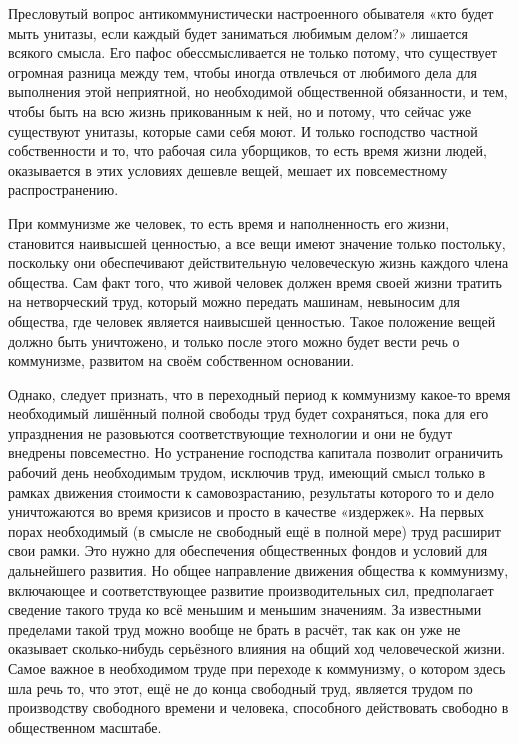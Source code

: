 \documentclass[../main]{subfiles}
\begin{document}
Пресловутый вопрос антикоммунистически настроенного обывателя «кто будет мыть унитазы, если каждый будет заниматься любимым делом?» лишается всякого смысла. Его пафос обессмысливается не только потому, что существует огромная разница между тем, чтобы иногда отвлечься от любимого дела для выполнения этой неприятной, но необходимой общественной обязанности, и тем, чтобы быть на всю жизнь прикованным к ней, но и потому, что сейчас уже существуют унитазы, которые сами себя моют. И только господство частной собственности и то, что рабочая сила уборщиков, то есть время жизни людей, оказывается в этих условиях дешевле вещей, мешает их повсеместному распространению.

При коммунизме же человек, то есть время и наполненность его жизни, становится наивысшей ценностью, а все вещи имеют значение только постольку, поскольку они обеспечивают действительную человеческую жизнь каждого члена общества. Сам факт того, что живой человек должен время своей жизни тратить на нетворческий труд, который можно передать машинам, невыносим для общества, где человек является наивысшей ценностью. Такое положение вещей должно быть уничтожено, и только после этого можно будет вести речь о коммунизме, развитом на своём собственном основании.

Однако, следует признать, что в переходный период к коммунизму какое-то время необходимый лишённый полной свободы труд будет сохраняться, пока для его упразднения не разовьются соответствующие технологии и они не будут внедрены повсеместно. Но устранение господства капитала позволит ограничить рабочий день необходимым трудом, исключив труд, имеющий смысл только в рамках движения стоимости к самовозрастанию, результаты которого то и дело уничтожаются во время кризисов и просто в качестве «издержек». На первых порах необходимый (в смысле не свободный ещё в полной мере) труд расширит свои рамки. Это нужно для обеспечения общественных фондов и условий для дальнейшего развития. Но общее направление движения общества к коммунизму, включающее и соответствующее развитие производительных сил, предполагает сведение такого труда ко всё меньшим и меньшим значениям. За известными пределами такой труд можно вообще не брать в расчёт, так как он уже не оказывает сколько-нибудь серьёзного влияния на общий ход человеческой жизни. Самое важное в необходимом труде при переходе к коммунизму, о котором здесь шла речь то, что этот, ещё не до конца свободный труд, является трудом по производству свободного времени и человека, способного действовать свободно в общественном масштабе.
\end{document}
